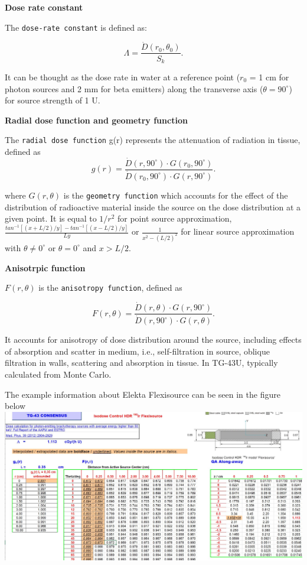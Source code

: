 \documentclass[]{book}
\theoremstyle{definition}
\theoremstyle{definition}
\theoremstyle{definition}
\theoremstyle{remark}
\begin{document}
\textbf{Dose rate constant}

The \texttt{dose-rate\ constant} is defined as:

\begin{equation}
   \Lambda = \frac{\dot D(r_0, \theta_0)}{S_k}.
   \label{eq:dose-rate-constant}
\end{equation}

It can be thought as the dose rate in water at a reference point
(\(r_0\) = 1 cm for photon sources and 2 mm for beta emitters) along the
transverse axis (\(\theta = 90^{\circ }\)) for source strength of 1 U.

\textbf{Radial dose function and geometry function}

The \texttt{radial\ dose\ function} g(r) represents the attenuation of
radiation in tissue, defined as\\

\begin{equation}
g(r) = \frac{\dot D(r,90^{\circ})\cdot G(r_0,90^{\circ})}{\dot D(r_0,90^{\circ})\cdot G(r, 90^{\circ})}.
\end{equation}

where \(G(r,\theta)\) is the \texttt{geometry\ function} which accounts
for the effect of the distribution of radioactive material inside the
source on the dose distribution at a given point. It is equal to
\(1/r^2\) for point source approximation,
\(\frac{tan^{-1}[(x+L/2)/y]-tan^{-1}[(x-L/2)/y]}{Ly}\) or
\(\frac{1}{x^2-(L/2)^2}\) for linear source approximation with
\(\theta \neq 0^{\circ}\) or \(\theta = 0^{\circ}\) and \(x>L/2\).

\textbf{Anisotrpic function}

\(F(r,\theta)\) is the \texttt{anisotropy\ function}, defined as

\begin{equation}
F(r,\theta) = \frac{\dot D(r,\theta)\cdot G(r,90^{\circ})}{\dot D(r,90^{\circ})\cdot G(r, \theta)}.
\end{equation}

It accounts for anisotropy of dose distribution around the source,
including effects of absorption and scatter in medium, i.e.,
self-filtration in source, oblique filtration in walls, scattering and
absorption in tissue. In TG-43U, typically calculated from Monte Carlo.

The example information about Elekta Flexisource can be seen in the
figure below \includegraphics{figures/Ir-192.jpg}
\end{document}
